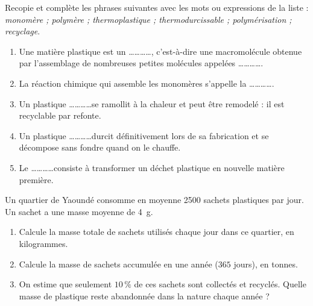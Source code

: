 \documentclass[11pt]{article}
\newcounter{popsec}
\newcounter{popsub}
\newcommand{\courssub}[1]{%
  \stepcounter{popsub}%
  \par\vspace{9pt}\noindent{\popxbold\fontsize{11.5}{13}\selectfont\color{popink}{\color{poporange}\thepopsec.\thepopsub}\hspace{6pt}#1}\par\nopagebreak\vspace{4pt}
}
\begin{document}
\begin{exercice}
Recopie et complète les phrases suivantes avec les mots ou expressions de la liste : \emph{monomère ; polymère ; thermoplastique ; thermodurcissable ; polymérisation ; recyclage}.
\begin{enumerate}
\item Une matière plastique est un \ldots\ldots\ldots\ldots, c'est-à-dire une macromolécule obtenue par l'assemblage de nombreuses petites molécules appelées \ldots\ldots\ldots\ldots.
\item La réaction chimique qui assemble les monomères s'appelle la \ldots\ldots\ldots\ldots.
\item Un plastique \ldots\ldots\ldots\ldots se ramollit à la chaleur et peut être remodelé : il est recyclable par refonte.
\item Un plastique \ldots\ldots\ldots\ldots durcit définitivement lors de sa fabrication et se décompose sans fondre quand on le chauffe.
\item Le \ldots\ldots\ldots\ldots consiste à transformer un déchet plastique en nouvelle matière première.
\end{enumerate}
\end{exercice}

\begin{exercice}
Un quartier de Yaoundé consomme en moyenne \num{2500} sachets plastiques par jour. Un sachet a une masse moyenne de \SI{4}{g}.
\begin{enumerate}
\item Calcule la masse totale de sachets utilisés chaque jour dans ce quartier, en kilogrammes.
\item Calcule la masse de sachets accumulée en une année ($365$ jours), en tonnes.
\item On estime que seulement $10\,\%$ de ces sachets sont collectés et recyclés. Quelle masse de plastique reste abandonnée dans la nature chaque année ?
\end{enumerate}
\end{exercice}

\courssub{Je m'entraîne}
\end{document}
